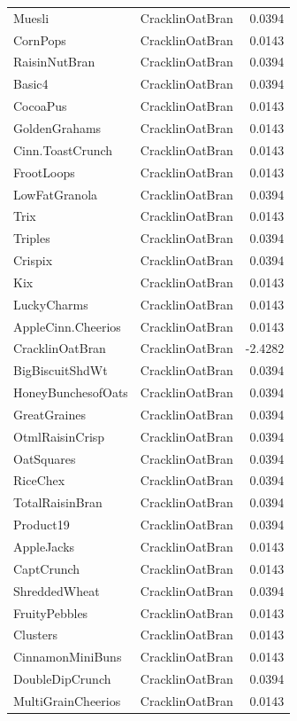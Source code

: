 \begin{longtable}{llr}
Muesli & CracklinOatBran & 0.0394 \\
CornPops & CracklinOatBran & 0.0143 \\
RaisinNutBran & CracklinOatBran & 0.0394 \\
Basic4 & CracklinOatBran & 0.0394 \\
CocoaPus & CracklinOatBran & 0.0143 \\
GoldenGrahams & CracklinOatBran & 0.0143 \\
Cinn.ToastCrunch & CracklinOatBran & 0.0143 \\
FrootLoops & CracklinOatBran & 0.0143 \\
LowFatGranola & CracklinOatBran & 0.0394 \\
Trix & CracklinOatBran & 0.0143 \\
Triples & CracklinOatBran & 0.0394 \\
Crispix & CracklinOatBran & 0.0394 \\
Kix & CracklinOatBran & 0.0143 \\
LuckyCharms & CracklinOatBran & 0.0143 \\
AppleCinn.Cheerios & CracklinOatBran & 0.0143 \\
CracklinOatBran & CracklinOatBran & -2.4282 \\
BigBiscuitShdWt & CracklinOatBran & 0.0394 \\
HoneyBunchesofOats & CracklinOatBran & 0.0394 \\
GreatGraines & CracklinOatBran & 0.0394 \\
OtmlRaisinCrisp & CracklinOatBran & 0.0394 \\
OatSquares & CracklinOatBran & 0.0394 \\
RiceChex & CracklinOatBran & 0.0394 \\
TotalRaisinBran & CracklinOatBran & 0.0394 \\
Product19 & CracklinOatBran & 0.0394 \\
AppleJacks & CracklinOatBran & 0.0143 \\
CaptCrunch & CracklinOatBran & 0.0143 \\
ShreddedWheat & CracklinOatBran & 0.0394 \\
FruityPebbles & CracklinOatBran & 0.0143 \\
Clusters & CracklinOatBran & 0.0143 \\
CinnamonMiniBuns & CracklinOatBran & 0.0143 \\
DoubleDipCrunch & CracklinOatBran & 0.0394 \\
MultiGrainCheerios & CracklinOatBran & 0.0143 \\

\end{longtable}

